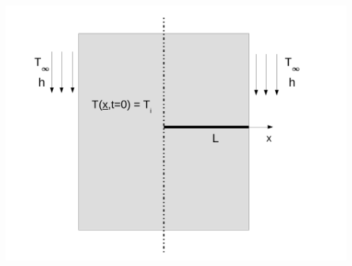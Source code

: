 \documentclass[10pt,compress,unknownkeysallowed]{beamer}
\begin{document}
\begin{frame}
\begin{columns}
\begin{column}[l]{0.6\linewidth}
    \end{column}
     \begin{column}[l]{0.4\linewidth}
        \begin{center}
          \includegraphics[width=1.1\columnwidth,height=1.3\columnwidth,clip]{./Pics/HT_PlaneWall}
        \end{center}
    \end{column}
  \end{columns}
\end{frame}
\end{document}
